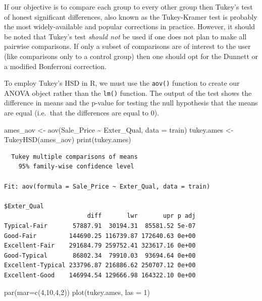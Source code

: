 \documentclass[
  letterpaper,
  DIV=11,
  numbers=noendperiod]{scrreprt}
\newenvironment{Shaded}{\begin{snugshade}}{\end{snugshade}}
\newcommand{\AttributeTok}[1]{\textcolor[rgb]{0.40,0.45,0.13}{#1}}
\newcommand{\DecValTok}[1]{\textcolor[rgb]{0.68,0.00,0.00}{#1}}
\newcommand{\FunctionTok}[1]{\textcolor[rgb]{0.28,0.35,0.67}{#1}}
\newcommand{\NormalTok}[1]{\textcolor[rgb]{0.00,0.23,0.31}{#1}}
\newcommand{\OtherTok}[1]{\textcolor[rgb]{0.00,0.23,0.31}{#1}}
\newcommand{\SpecialCharTok}[1]{\textcolor[rgb]{0.37,0.37,0.37}{#1}}
\begin{document}
If our objective is to compare each group to every other group then
Tukey's test of honest significant differences, also known as the
Tukey-Kramer test is probably the most widely-available and popular
corrections in practice. However, it should be noted that Tukey's test
\emph{should not} be used if one does not plan to make all pairwise
comparisons. If only a subset of comparisons are of interest to the user
(like comparisons only to a control group) then one should opt for the
Dunnett or a modified Bonferroni correction.

To employ Tukey's HSD in R, we must use the \texttt{aov()} function to
create our ANOVA object rather than the \texttt{lm()} function. The
output of the test shows the difference in means and the p-value for
testing the null hypothesis that the means are equal (i.e.~that the
differences are equal to 0).

\begin{Shaded}
\begin{Highlighting}[]
\NormalTok{ames\_aov }\OtherTok{\textless{}{-}} \FunctionTok{aov}\NormalTok{(Sale\_Price }\SpecialCharTok{\textasciitilde{}}\NormalTok{ Exter\_Qual, }\AttributeTok{data =}\NormalTok{ train)}
\NormalTok{tukey.ames }\OtherTok{\textless{}{-}} \FunctionTok{TukeyHSD}\NormalTok{(ames\_aov)}
\FunctionTok{print}\NormalTok{(tukey.ames)}
\end{Highlighting}
\end{Shaded}

\begin{verbatim}
  Tukey multiple comparisons of means
    95% family-wise confidence level

Fit: aov(formula = Sale_Price ~ Exter_Qual, data = train)

$Exter_Qual
                       diff       lwr       upr p adj
Typical-Fair       57887.91  30194.31  85581.52 5e-07
Good-Fair         144690.25 116739.87 172640.63 0e+00
Excellent-Fair    291684.79 259752.41 323617.16 0e+00
Good-Typical       86802.34  79910.03  93694.64 0e+00
Excellent-Typical 233796.87 216886.62 250707.12 0e+00
Excellent-Good    146994.54 129666.98 164322.10 0e+00
\end{verbatim}

\begin{Shaded}
\begin{Highlighting}[]
\FunctionTok{par}\NormalTok{(}\AttributeTok{mar=}\FunctionTok{c}\NormalTok{(}\DecValTok{4}\NormalTok{,}\DecValTok{10}\NormalTok{,}\DecValTok{4}\NormalTok{,}\DecValTok{2}\NormalTok{))}
\FunctionTok{plot}\NormalTok{(tukey.ames, }\AttributeTok{las =} \DecValTok{1}\NormalTok{)}
\end{Highlighting}
\end{Shaded}
\end{document}
